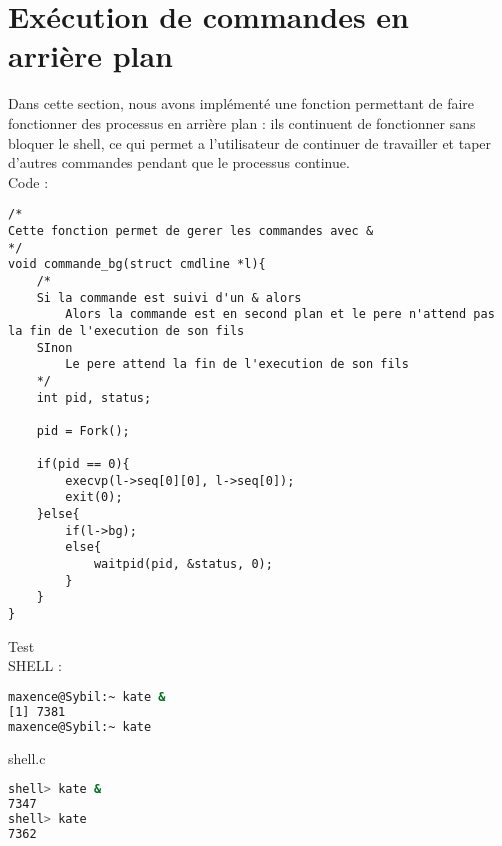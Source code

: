 \documentclass{report}
\begin{document}
		\section{Ex\'ecution de commandes en arri\`ere plan}
			Dans cette section, nous avons impl\'ement\'e une fonction permettant de faire fonctionner des processus en arri\`ere plan : ils continuent de fonctionner sans bloquer le shell, ce qui permet a l'utilisateur de continuer de travailler et taper d'autres commandes pendant que le processus continue.\\Code :
			\begin{lstlisting}
/*
Cette fonction permet de gerer les commandes avec &
*/
void commande_bg(struct cmdline *l){
	/*
	Si la commande est suivi d'un & alors
		Alors la commande est en second plan et le pere n'attend pas la fin de l'execution de son fils
	SInon
		Le pere attend la fin de l'execution de son fils
	*/ 
	int pid, status;

	pid = Fork();

	if(pid == 0){
		execvp(l->seq[0][0], l->seq[0]);
		exit(0);
	}else{
		if(l->bg);
		else{
			waitpid(pid, &status, 0);
		}
	}
}
	\end{lstlisting}			
	Test \\ SHELL :
	\begin{lstlisting}[frame=single,basicstyle=\footnotesize,language=bash]
maxence@Sybil:~ kate &
[1] 7381
maxence@Sybil:~ kate

			\end{lstlisting}
			shell.c
			\begin{lstlisting}[frame=single,basicstyle=\footnotesize,language=bash]
shell> kate &
7347
shell> kate
7362

			\end{lstlisting}
\end{document}
